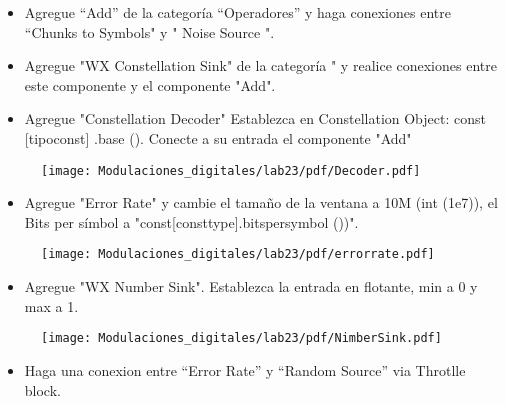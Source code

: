 
\begin{frame}
\begin{itemize}
    \item {Agregue “Add” de la categoría “Operadores” y haga conexiones entre “Chunks to Symbols" y " Noise Source ".}
    \item{Agregue "WX Constellation Sink" de la categoría " y realice conexiones entre este componente y el componente "Add".}
    \item{Agregue "Constellation Decoder" Establezca en Constellation Object: const [tipoconst] .base (). 
    Conecte a su entrada el componente "Add" }
\end{itemize}
\end{frame}


\begin{frame}
\begin{figure}[H]
\vspace{-3mm}
\centering
\texttt{[image: Modulaciones\_digitales/lab23/pdf/Decoder.pdf]}
\end{figure}
\end{frame}


\begin{frame}
\begin{itemize}
\item{Agregue "Error Rate"  y cambie el tamaño de la ventana a 10M (int (1e7)), el Bits per símbol a "const[consttype].bitspersymbol ())".}
\end{itemize}
\begin{figure}[H]
\vspace{-3mm}
\centering
\texttt{[image: Modulaciones\_digitales/lab23/pdf/errorrate.pdf]}
\end{figure}
\end{frame}


\begin{frame}
    \begin{itemize}
        \item {Agregue "WX Number Sink". Establezca la entrada en flotante, min a 0 y max a 1.}
\end{itemize}
\begin{figure}[H]
\vspace{-3mm}
\centering
\texttt{[image: Modulaciones\_digitales/lab23/pdf/NimberSink.pdf]}
\end{figure}
\begin{itemize}
    \item{Haga una conexion entre “Error Rate” y “Random Source” via Throtlle block.}
    \end{itemize}
\end{frame}

